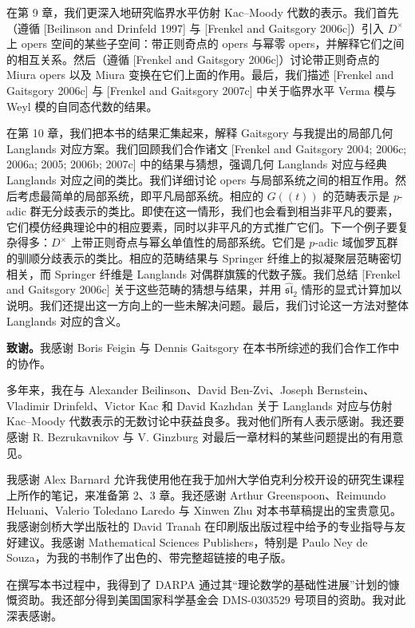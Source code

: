 在第 9 章，我们更深入地研究临界水平仿射 Kac--Moody 代数的表示。我们首先（遵循 [Beilinson and Drinfeld 1997] 与 [Frenkel and Gaitsgory 2006c]）引入 $D^\times$ 上 opers 空间的某些子空间：带正则奇点的 opers 与幂零 opers，并解释它们之间的相互关系。然后（遵循 [Frenkel and Gaitsgory 2006c]）讨论带正则奇点的 Miura opers 以及 Miura 变换在它们上面的作用。最后，我们描述 [Frenkel and Gaitsgory 2006c] 与 [Frenkel and Gaitsgory 2007c] 中关于临界水平 Verma 模与 Weyl 模的自同态代数的结果。

在第 10 章，我们把本书的结果汇集起来，解释 Gaitsgory 与我提出的局部几何 Langlands 对应方案。我们回顾我们合作诸文 [Frenkel and Gaitsgory 2004; 2006c; 2006a; 2005; 2006b; 2007c] 中的结果与猜想，强调几何 Langlands 对应与经典 Langlands 对应之间的类比。我们详细讨论 opers 与局部系统之间的相互作用。然后考虑最简单的局部系统，即平凡局部系统。相应的 $G(\!(t)\!)$ 的范畴表示是 $p$-adic 群无分歧表示的类比。即使在这一情形，我们也会看到相当非平凡的要素，它们模仿经典理论中的相应要素，同时以非平凡的方式推广它们。下一个例子要复杂得多：$D^\times$ 上带正则奇点与幂幺单值性的局部系统。它们是 $p$-adic 域伽罗瓦群的驯顺分歧表示的类比。相应的范畴结果与 Springer 纤维上的拟凝聚层范畴密切相关，而 Springer 纤维是 Langlands 对偶群旗簇的代数子簇。我们总结 [Frenkel and Gaitsgory 2006c] 关于这些范畴的猜想与结果，并用 $\hat{\mathfrak{sl}}_2$ 情形的显式计算加以说明。我们还提出这一方向上的一些未解决问题。最后，我们讨论这一方法对整体 Langlands 对应的含义。

\noindent\textbf{致谢。}我感谢 Boris Feigin 与 Dennis Gaitsgory 在本书所综述的我们合作工作中的协作。

多年来，我在与 Alexander Beilinson、David Ben-Zvi、Joseph Bernstein、Vladimir Drinfeld、Victor Kac 和 David Kazhdan 关于 Langlands 对应与仿射 Kac--Moody 代数表示的无数讨论中获益良多。我对他们所有人表示感谢。我还要感谢 R. Bezrukavnikov 与 V. Ginzburg 对最后一章材料的某些问题提出的有用意见。

我感谢 Alex Barnard 允许我使用他在我于加州大学伯克利分校开设的研究生课程上所作的笔记，来准备第 2、3 章。我还感谢 Arthur Greenspoon、Reimundo Heluani、Valerio Toledano Laredo 与 Xinwen Zhu 对本书草稿提出的宝贵意见。我感谢剑桥大学出版社的 David Tranah 在印刷版出版过程中给予的专业指导与友好建议。我感谢 Mathematical Sciences Publishers，特别是 Paulo Ney de Souza，为我的书制作了出色的、带完整超链接的电子版。

在撰写本书过程中，我得到了 DARPA 通过其“理论数学的基础性进展”计划的慷慨资助。我还部分得到美国国家科学基金会 DMS-0303529 号项目的资助。我对此深表感谢。
